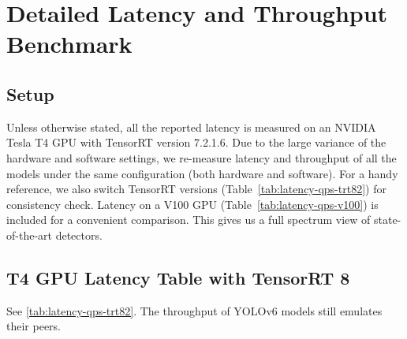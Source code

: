 \documentclass[10pt,twocolumn,letterpaper]{article}
\begin{document}
\clearpage

\appendix

\section{Detailed Latency and Throughput Benchmark}\label{app:bench}
\subsection{Setup}
Unless otherwise stated, all the reported latency is measured on an NVIDIA Tesla T4 GPU with TensorRT version 7.2.1.6. Due to the large variance of the hardware and software settings, we re-measure latency and throughput of all the models under the same configuration (both hardware and software). For a handy reference, we also switch TensorRT versions (Table~\ref{tab:latency-qps-trt82}) for consistency check. Latency on a V100 GPU (Table~\ref{tab:latency-qps-v100}) is included for a convenient comparison. This gives us a full spectrum view of state-of-the-art detectors.

\subsection{T4 GPU Latency Table with TensorRT 8}

See \cref{tab:latency-qps-trt82}. The throughput of YOLOv6 models still emulates their peers.
\end{document}
